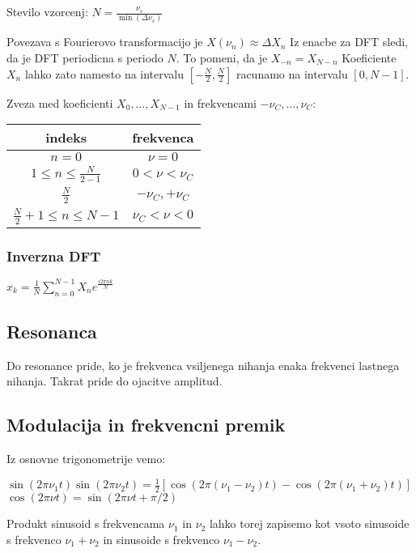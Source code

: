 \documentclass{article}
\begin{document}
\begin{multicols}{4}
	Stevilo vzorcenj: $N = \frac{\nu_s}{\min(\Delta \nu_s)}$

	Povezava s Fourierovo transformacijo je $X(\nu_n) \approx \Delta X_n$
	Iz enacbe za DFT sledi, da je DFT periodicna s periodo $N$. To pomeni, da je $X_{-n} = X_{N-n}$
	Koeficiente $X_n$ lahko zato namesto na intervalu $[-\frac{N}{2}, \frac{N}{2}]$ racunamo na
	intervalu $[0, N - 1]$.

	Zveza med koeficienti $X_0, \dots, X_{N-1}$ in frekvencami $- \nu_C, \dots, \nu_C$:
	\begin{center}
		\begin{tabular}{ cc }
			indeks                              & frekvenca         \\
			\hline
			$n = 0$                             & $\nu = 0$         \\
			$1 \leq n \leq \frac{N}{2-1}$       & $0 < \nu < \nu_C$ \\
			$\frac{N}{2}$                       & $-\nu_C, + \nu_C$ \\
			$\frac{N}{2} + 1 \leq n \leq N - 1$ & $\nu_C < \nu < 0$ \\
			\hline
		\end{tabular}
	\end{center}

	\subsubsection{Inverzna DFT}
	\begin{center}
		\begin{math}
			x_k = \frac{1}{N} \sum_{n=0}^{N-1} X_{n}e^{\frac{i2 \pi n k}{N}}
		\end{math}
	\end{center}

	\subsection{Resonanca}
	Do resonance pride, ko je frekvenca vsiljenega nihanja enaka frekvenci lastnega nihanja. Takrat pride do ojacitve amplitud.

	\subsection{Modulacija in frekvencni premik}

	Iz osnovne trigonometrije vemo:
	\begin{center}
		\begin{math}
			\sin(2 \pi \nu_1 t) \sin(2 \pi \nu_2 t) = \frac{1}{2} [\cos(2 \pi(\nu_1 - \nu_2)t) - \cos(2 \pi (\nu_1 + \nu_2)t)]
		\end{math}\\
		\begin{math}
			\cos(2 \pi \nu t) = \sin(2 \pi \nu t + \pi / 2)
		\end{math}
	\end{center}
	Produkt sinusoid s frekvencama $\nu_1$ in $\nu_2$ lahko torej zapisemo kot vsoto sinusoide s frekvenco $\nu_1 + \nu_2$ in
	sinusoide s frekvenco $\nu_1 - \nu_2$.


\end{multicols}
\end{document}
